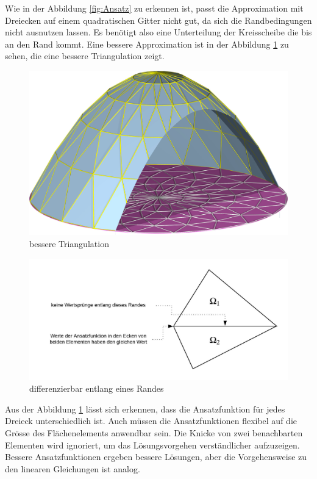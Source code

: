 Wie in der Abbildung \ref{fig:Ansatz} zu erkennen ist, passt die Approximation mit Dreiecken auf einem quadratischen Gitter nicht gut, da sich die Randbedingungen nicht ausnutzen lassen. Es benötigt also eine Unterteilung der Kreisscheibe die bis an den Rand kommt. Eine bessere Approximation ist in der Abbildung \ref{fig:besser Approx} zu sehen, die eine bessere Triangulation zeigt.
\begin{figure}[h!]
	\centering
	\includegraphics[scale=0.8]{papers/fem/Images/polar.jpg}
	\caption{bessere Triangulation}
	\label{fig:besser Approx}
\end{figure}
\begin{figure}[h]
	\centering
	\includegraphics[scale=0.8]{papers/fem/Images/Rand.jpeg}
	\caption{differenzierbar entlang eines Randes}
	\label{fig:Randbedingung}
\end{figure}
Aus der Abbildung \ref{fig:besser Approx} lässt sich erkennen, dass die Ansatzfunktion für jedes Dreieck unterschiedlich ist. Auch müssen die Ansatzfunktionen flexibel auf die Grösse des Flächenelements anwendbar sein. Die Knicke von zwei benachbarten Elementen wird ignoriert, um das Lösungsvorgehen verständlicher aufzuzeigen. Bessere Ansatzfunktionen ergeben bessere Lösungen, aber die Vorgehensweise zu den linearen Gleichungen ist analog.
